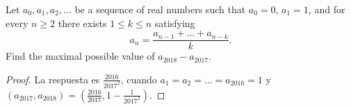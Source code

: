 \begin{problem}
	Let $a_0,a_1,a_2,\dots$ be a sequence of real numbers such that $a_0=0$, $a_1=1$, and for every $n\ge 2$ there exists $1\le k\le n$ satisfying
	\[a_n=\frac{a_{n-1}+\dots+a_{n-k}}{k}.\]
	Find the maximal possible value of $a_{2018}-a_{2017}$.
\end{problem}

\begin{proof}
	La respuesta es $\frac{2016}{2017^2}$, cuando $a_1=a_2=\dots=a_{2016}=1$ y $(a_{2017},a_{2018})=\left(\frac{2016}{2017},1-\frac{1}{2017^2}\right)$.
\end{proof}
